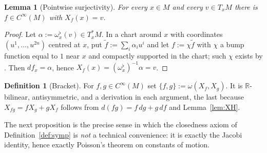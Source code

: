 \documentclass[10pt,a4paper]{article}
\theoremstyle{plain}
\newtheorem{lemma}[theorem]{Lemma}
\theoremstyle{definition}
\newtheorem{definition}[theorem]{Definition}
\newcommand{\Cinf}{C^{\infty}}
\newcommand{\R}{\mathbb{R}}
\newcommand{\PB}[2]{\{#1,#2\}}
\begin{document}
\begin{lemma}[Pointwise surjectivity]
\label{lem:surj}
For every $x \in M$ and every $v \in T_xM$ there is $f \in \Cinf(M)$ with $X_f(x) = v$.
\end{lemma}
\begin{proof}
Let $\alpha := \omega^\flat_x(v) \in T^*_xM$. In a chart around $x$ with coordinates $(u^1,\dots,u^{2n})$ centred at $x$, put $\tilde f := \sum_i \alpha_i u^i$ and let $f := \chi \tilde f$ with $\chi$ a bump function equal to $1$ near $x$ and compactly supported in the chart; such $\chi$ exists by \cite[Ch.~2]{Lee2013}. Then $df_x = \alpha$, hence $X_f(x) = (\omega^\flat_x)^{-1}\alpha = v$.
\end{proof}

\begin{definition}[Bracket]
\label{def:bracket}
For $f,g \in \Cinf(M)$ set $\PB{f}{g} := \omega(X_f,X_g)$. It is $\R$-bilinear, antisymmetric, and a derivation in each argument, the last because $X_{fg} = f X_g + g X_f$ follows from $d(fg) = f\,dg + g\,df$ and Lemma~\ref{lem:XH}.
\end{definition}

The next proposition is the precise sense in which the closedness axiom of Definition~\ref{def:symp} is \emph{not} a technical convenience: it is exactly the Jacobi identity, hence exactly Poisson's theorem on constants of motion.
\end{document}
